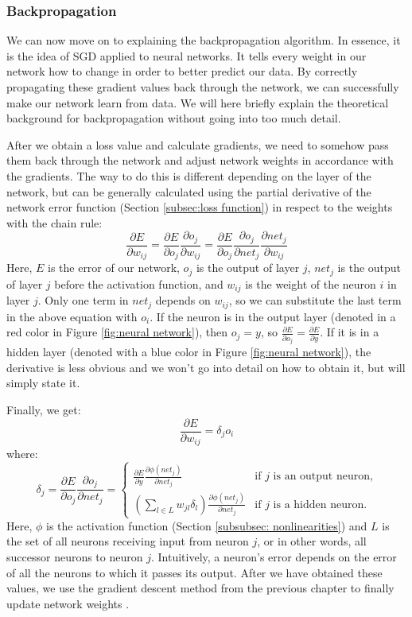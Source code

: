 \documentclass[times, utf8, diplomski, english]{fer_eng}
\begin{document}
\subsubsection{Backpropagation}
\label{subsubsec:backpropagation}

We can now move on to explaining the backpropagation algorithm. In essence, it is the idea of SGD applied to neural networks. It tells every weight in our network how to change in order to better predict our data. By correctly propagating these gradient values back through the network, we can successfully make our network learn from data. We will here briefly explain the theoretical background for backpropagation without going into too much detail.

After we obtain a loss value and calculate gradients, we need to somehow pass them back through the network and adjust network weights in accordance with the gradients. The way to do this is different depending on the layer of the network, but can be generally calculated using the partial derivative of the network error function (Section \ref{subsec:loss function}) in respect to the weights with the chain rule:
\[ \frac{\partial E}{\partial w_{ij}} = \frac{\partial E}{\partial o_j} \frac{\partial o_j}{\partial w_{ij}} = \frac{\partial E}{\partial o_j} \frac{\partial o_j}{\partial net_j} \frac{\partial net_j}{\partial w_{ij}}\]
Here, $E$ is the error of our network, $o_j$ is the output of layer $j$, $net_j$ is the output of layer $j$ before the activation function, and $w_{ij}$ is the weight of the neuron $i$ in layer $j$. Only one term in $net_j$ depends on $w_{ij}$, so we can substitute the last term in the above equation with $o_i$. If the neuron is in the output layer (denoted in a red color in Figure \ref{fig:neural network}), then $o_j = y$, so $\frac{\partial E}{\partial o_{j}} = \frac{\partial E}{\partial y}$. If it is in a hidden layer (denoted with a blue color in Figure \ref{fig:neural network}), the derivative is less obvious and we won't go into detail on how to obtain it, but will simply state it.

Finally, we get:
\[ \frac{\partial E}{\partial w_{ij}} = \delta_j o_i \]
where:
\[ \delta_j = \frac{\partial E}{\partial o_j} \frac{\partial o_j}{\partial net_j} = \begin{cases}
	\frac{\partial E}{\partial y} \frac{\partial \phi(net_j)}{\partial net_j} & \text{if $j$ is an output neuron,} \\
	(\sum_{l \in L} w_{jl} \delta_l) \frac{\partial \phi(net_j)}{\partial net_j} & \text{if $j$ is a hidden neuron.}
\end{cases}
\]
Here, $\phi$ is the activation function (Section \ref{subsubsec: nonlinearities}) and $L$ is the set of all neurons receiving input from neuron $j$, or in other words, all successor neurons to neuron $j$. Intuitively, a neuron's error depends on the error of all the neurons to which it passes its output. After we have obtained these values, we use the gradient descent method from the previous chapter to finally update network weights \cite{Goodfellow-et-al-2016}.
\end{document}
